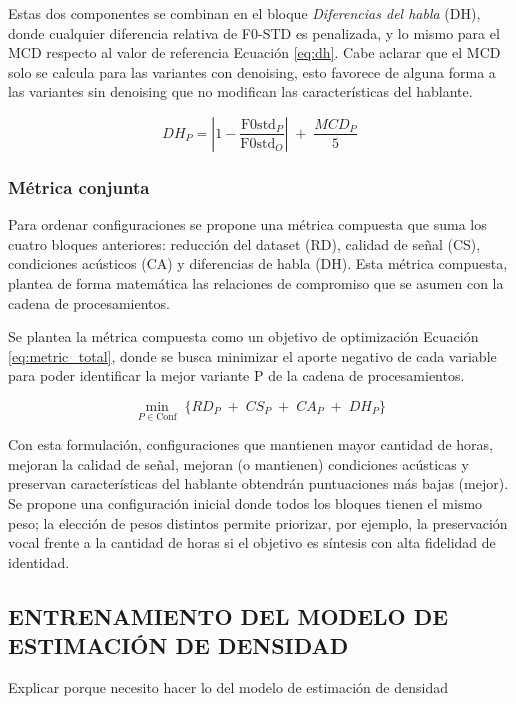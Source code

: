 Estas dos componentes se combinan en el bloque \emph{Diferencias del habla} (DH), donde cualquier diferencia relativa de F0-STD es penalizada, y lo mismo para el MCD respecto al valor de referencia Ecuación \ref{eq:dh}. Cabe aclarar que el MCD solo se calcula para las variantes con denoising, esto favorece de alguna forma a las variantes sin denoising que no modifican las características del hablante.

\begin{equation}
\label{eq:dh}
DH_P = 
\left|1 - \frac{\mathrm{F0std}_P}{\mathrm{F0std}_O}\right|
\;+\; \frac{MCD_P}{5}
\end{equation}

\subsubsection{Métrica conjunta}
Para ordenar configuraciones se propone una métrica compuesta que suma los cuatro bloques anteriores: reducción del dataset (RD), calidad de señal (CS), condiciones acústicos (CA) y diferencias de habla (DH). Esta métrica compuesta, plantea de forma matemática las relaciones de compromiso que se asumen con la cadena de procesamientos. 

Se plantea la métrica compuesta como un objetivo de optimización Ecuación \ref{eq:metric_total}, donde se busca minimizar el aporte negativo de cada variable para poder identificar la mejor variante P de la cadena de procesamientos.

\begin{equation}
\label{eq:metric_total}
\min_{P \in \mathrm{Conf}}\;
\Big\{
RD_{P}
\;+\;
CS_{P}
\;+\;
CA_{P}
\;+\;
DH_{P}
\Big\}
\end{equation}

Con esta formulación, configuraciones que mantienen mayor cantidad de horas, mejoran la calidad de señal, mejoran (o mantienen) condiciones acústicas y preservan características del hablante obtendrán puntuaciones más bajas (mejor). Se propone una configuración inicial donde todos los bloques tienen el mismo peso; la elección de pesos distintos permite priorizar, por ejemplo, la preservación vocal frente a la cantidad de horas si el objetivo es síntesis con alta fidelidad de identidad.

\subsection{ENTRENAMIENTO DEL MODELO DE ESTIMACIÓN DE DENSIDAD}
Explicar porque necesito hacer lo del modelo de estimación de densidad

